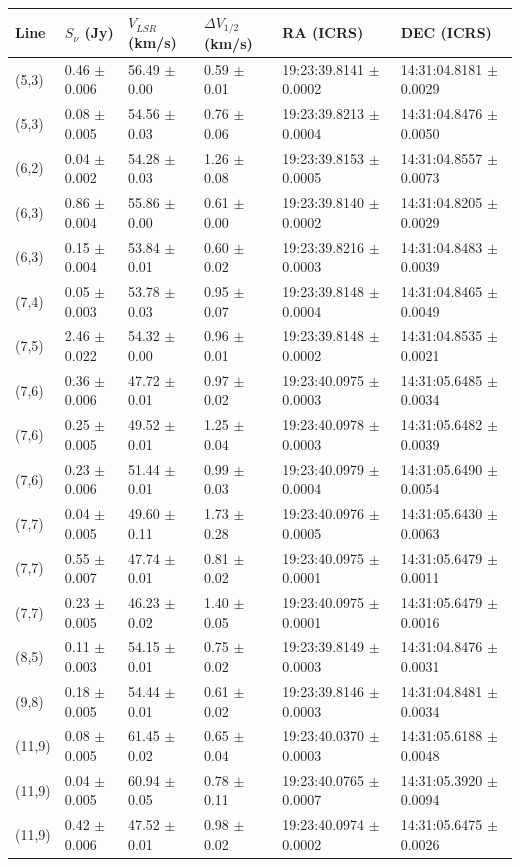 \begin{tabular}{llllll}
\toprule
Line & $S_{\nu}$ (Jy) & $V_{LSR}$ (km/s) & $\Delta V_{1/2}$ (km/s) & RA (ICRS) & DEC (ICRS) \\
\midrule
(5,3) & 0.46 $ \pm $ 0.006 & 56.49 $ \pm $ 0.00 & 0.59 $ \pm $ 0.01 & 19:23:39.8141 $ \pm $ 0.0002 & 14:31:04.8181 $ \pm $ 0.0029 \\
(5,3) & 0.08 $ \pm $ 0.005 & 54.56 $ \pm $ 0.03 & 0.76 $ \pm $ 0.06 & 19:23:39.8213 $ \pm $ 0.0004 & 14:31:04.8476 $ \pm $ 0.0050 \\
(6,2) & 0.04 $ \pm $ 0.002 & 54.28 $ \pm $ 0.03 & 1.26 $ \pm $ 0.08 & 19:23:39.8153 $ \pm $ 0.0005 & 14:31:04.8557 $ \pm $ 0.0073 \\
(6,3) & 0.86 $ \pm $ 0.004 & 55.86 $ \pm $ 0.00 & 0.61 $ \pm $ 0.00 & 19:23:39.8140 $ \pm $ 0.0002 & 14:31:04.8205 $ \pm $ 0.0029 \\
(6,3) & 0.15 $ \pm $ 0.004 & 53.84 $ \pm $ 0.01 & 0.60 $ \pm $ 0.02 & 19:23:39.8216 $ \pm $ 0.0003 & 14:31:04.8483 $ \pm $ 0.0039 \\
(7,4) & 0.05 $ \pm $ 0.003 & 53.78 $ \pm $ 0.03 & 0.95 $ \pm $ 0.07 & 19:23:39.8148 $ \pm $ 0.0004 & 14:31:04.8465 $ \pm $ 0.0049 \\
(7,5) & 2.46 $ \pm $ 0.022 & 54.32 $ \pm $ 0.00 & 0.96 $ \pm $ 0.01 & 19:23:39.8148 $ \pm $ 0.0002 & 14:31:04.8535 $ \pm $ 0.0021 \\
(7,6) & 0.36 $ \pm $ 0.006 & 47.72 $ \pm $ 0.01 & 0.97 $ \pm $ 0.02 & 19:23:40.0975 $ \pm $ 0.0003 & 14:31:05.6485 $ \pm $ 0.0034 \\
(7,6) & 0.25 $ \pm $ 0.005 & 49.52 $ \pm $ 0.01 & 1.25 $ \pm $ 0.04 & 19:23:40.0978 $ \pm $ 0.0003 & 14:31:05.6482 $ \pm $ 0.0039 \\
(7,6) & 0.23 $ \pm $ 0.006 & 51.44 $ \pm $ 0.01 & 0.99 $ \pm $ 0.03 & 19:23:40.0979 $ \pm $ 0.0004 & 14:31:05.6490 $ \pm $ 0.0054 \\
(7,7) & 0.04 $ \pm $ 0.005 & 49.60 $ \pm $ 0.11 & 1.73 $ \pm $ 0.28 & 19:23:40.0976 $ \pm $ 0.0005 & 14:31:05.6430 $ \pm $ 0.0063 \\
(7,7) & 0.55 $ \pm $ 0.007 & 47.74 $ \pm $ 0.01 & 0.81 $ \pm $ 0.02 & 19:23:40.0975 $ \pm $ 0.0001 & 14:31:05.6479 $ \pm $ 0.0011 \\
(7,7) & 0.23 $ \pm $ 0.005 & 46.23 $ \pm $ 0.02 & 1.40 $ \pm $ 0.05 & 19:23:40.0975 $ \pm $ 0.0001 & 14:31:05.6479 $ \pm $ 0.0016 \\
(8,5) & 0.11 $ \pm $ 0.003 & 54.15 $ \pm $ 0.01 & 0.75 $ \pm $ 0.02 & 19:23:39.8149 $ \pm $ 0.0003 & 14:31:04.8476 $ \pm $ 0.0031 \\
(9,8) & 0.18 $ \pm $ 0.005 & 54.44 $ \pm $ 0.01 & 0.61 $ \pm $ 0.02 & 19:23:39.8146 $ \pm $ 0.0003 & 14:31:04.8481 $ \pm $ 0.0034 \\
(11,9) & 0.08 $ \pm $ 0.005 & 61.45 $ \pm $ 0.02 & 0.65 $ \pm $ 0.04 & 19:23:40.0370 $ \pm $ 0.0003 & 14:31:05.6188 $ \pm $ 0.0048 \\
(11,9) & 0.04 $ \pm $ 0.005 & 60.94 $ \pm $ 0.05 & 0.78 $ \pm $ 0.11 & 19:23:40.0765 $ \pm $ 0.0007 & 14:31:05.3920 $ \pm $ 0.0094 \\
(11,9) & 0.42 $ \pm $ 0.006 & 47.52 $ \pm $ 0.01 & 0.98 $ \pm $ 0.02 & 19:23:40.0974 $ \pm $ 0.0002 & 14:31:05.6475 $ \pm $ 0.0026 \\
\bottomrule
\end{tabular}
